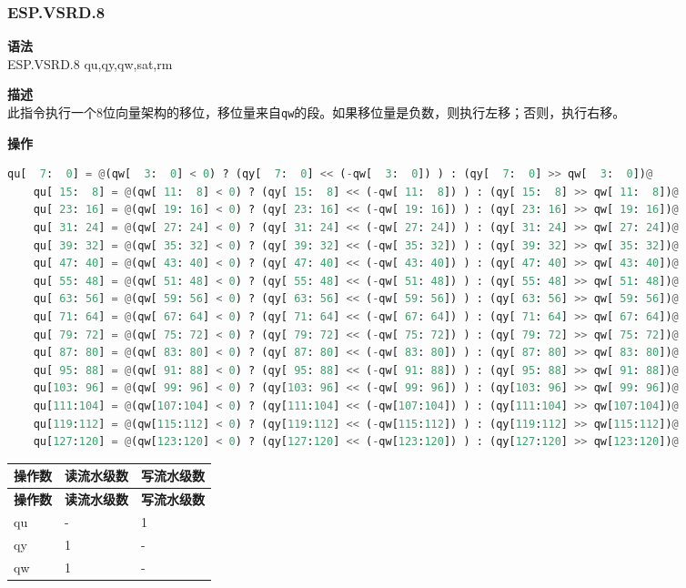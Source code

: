 \newpage

\newpage
\subsubsection{ESP.VSRD.8}\label{instruction:ESPVSrd8}
\textbf{语法}\\
ESP.VSRD.8 qu,qy,qw,sat,rm

\textbf{描述}\\
此指令执行一个8位向量架构的移位，移位量来自\lstinline{qw}的段。如果移位量是负数，则执行左移；否则，执行右移。

\textbf{操作}\\
\begin{lstlisting}[language=Python, escapechar=@]
    qu[  7:  0] = @(qw[  3:  0] < 0) ? (qy[  7:  0] << (-qw[  3:  0]) ) : (qy[  7:  0] >> qw[  3:  0])@
    qu[ 15:  8] = @(qw[ 11:  8] < 0) ? (qy[ 15:  8] << (-qw[ 11:  8]) ) : (qy[ 15:  8] >> qw[ 11:  8])@
    qu[ 23: 16] = @(qw[ 19: 16] < 0) ? (qy[ 23: 16] << (-qw[ 19: 16]) ) : (qy[ 23: 16] >> qw[ 19: 16])@
    qu[ 31: 24] = @(qw[ 27: 24] < 0) ? (qy[ 31: 24] << (-qw[ 27: 24]) ) : (qy[ 31: 24] >> qw[ 27: 24])@
    qu[ 39: 32] = @(qw[ 35: 32] < 0) ? (qy[ 39: 32] << (-qw[ 35: 32]) ) : (qy[ 39: 32] >> qw[ 35: 32])@
    qu[ 47: 40] = @(qw[ 43: 40] < 0) ? (qy[ 47: 40] << (-qw[ 43: 40]) ) : (qy[ 47: 40] >> qw[ 43: 40])@
    qu[ 55: 48] = @(qw[ 51: 48] < 0) ? (qy[ 55: 48] << (-qw[ 51: 48]) ) : (qy[ 55: 48] >> qw[ 51: 48])@
    qu[ 63: 56] = @(qw[ 59: 56] < 0) ? (qy[ 63: 56] << (-qw[ 59: 56]) ) : (qy[ 63: 56] >> qw[ 59: 56])@
    qu[ 71: 64] = @(qw[ 67: 64] < 0) ? (qy[ 71: 64] << (-qw[ 67: 64]) ) : (qy[ 71: 64] >> qw[ 67: 64])@
    qu[ 79: 72] = @(qw[ 75: 72] < 0) ? (qy[ 79: 72] << (-qw[ 75: 72]) ) : (qy[ 79: 72] >> qw[ 75: 72])@
    qu[ 87: 80] = @(qw[ 83: 80] < 0) ? (qy[ 87: 80] << (-qw[ 83: 80]) ) : (qy[ 87: 80] >> qw[ 83: 80])@
    qu[ 95: 88] = @(qw[ 91: 88] < 0) ? (qy[ 95: 88] << (-qw[ 91: 88]) ) : (qy[ 95: 88] >> qw[ 91: 88])@
    qu[103: 96] = @(qw[ 99: 96] < 0) ? (qy[103: 96] << (-qw[ 99: 96]) ) : (qy[103: 96] >> qw[ 99: 96])@
    qu[111:104] = @(qw[107:104] < 0) ? (qy[111:104] << (-qw[107:104]) ) : (qy[111:104] >> qw[107:104])@
    qu[119:112] = @(qw[115:112] < 0) ? (qy[119:112] << (-qw[115:112]) ) : (qy[119:112] >> qw[115:112])@
    qu[127:120] = @(qw[123:120] < 0) ? (qy[127:120] << (-qw[123:120]) ) : (qy[127:120] >> qw[123:120])@
\end{lstlisting}

\begin{longtable}[c]{|l|l|l|}
    \hline
    \rowcolor{lightgray}
    \textbf{操作数} & \textbf{读流水级数} & \textbf{写流水级数} \\\hline
    \endfirsthead
    \rowcolor{lightgray}
     \textbf{操作数} & \textbf{读流水级数} & \textbf{写流水级数} \\\hline
    \endhead
    \endfoot

  qu & - & 1 \\\hline
  qy & 1 & - \\\hline
  qw & 1 & - \\\hline

\end{longtable}


